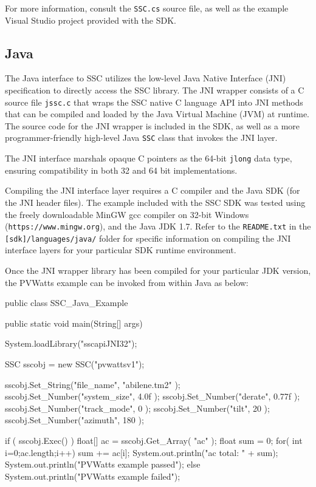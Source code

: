 \documentclass{article}
\begin{document}
For more information, consult the \texttt{SSC.cs} source file, as well as the example Visual Studio project provided with the SDK.

\subsection{Java}

The Java interface to SSC utilizes the low-level Java Native Interface (JNI) specification to directly access the SSC library.  The JNI wrapper consists of a C source file \texttt{jssc.c} that wraps the SSC native C language API into JNI methods that can be compiled and loaded by the Java Virtual Machine (JVM) at runtime.  The source code for the JNI wrapper is included in the SDK, as well as a more programmer-friendly high-level Java \texttt{SSC} class that invokes the JNI layer.

The JNI interface marshals opaque C pointers as the 64-bit \texttt{jlong} data type, ensuring compatibility in both 32 and 64 bit implementations.

Compiling the JNI interface layer requires a C compiler and the Java SDK (for the JNI header files).  The example included with the SSC SDK was tested using the freely downloadable MinGW gcc compiler on 32-bit Windows (\texttt{https://www.mingw.org}), and the Java JDK 1.7.  Refer to the \texttt{README.txt} in the \texttt{[sdk]/languages/java/} folder for specific information on compiling the JNI interface layers for your particular SDK runtime environment.

Once the JNI wrapper library has been compiled for your particular JDK version, the PVWatts example can be invoked from within Java as below:

\begin{verbatimtab}[4]

public class SSC_Java_Example {
   
    public static void main(String[] args)
    {
        System.loadLibrary("sscapiJNI32");
		
        SSC sscobj = new SSC("pvwattsv1");

        sscobj.Set_String("file_name", "abilene.tm2" );
        sscobj.Set_Number("system_size", 4.0f );
        sscobj.Set_Number("derate", 0.77f );
        sscobj.Set_Number("track_mode", 0 );
        sscobj.Set_Number("tilt", 20 );
        sscobj.Set_Number("azimuth", 180 );
        
		if ( sscobj.Exec() )
        {
            float[] ac = sscobj.Get_Array( "ac" );
            float sum = 0;
            for( int i=0;ac.length;i++)
            {
                sum += ac[i];
            }
            System.out.println("ac total: " + sum);
            System.out.println("PVWatts example passed");
        }
        else
        {
            System.out.println("PVWatts example failed");
        }
    }    
}

\end{verbatimtab}
\end{document}
